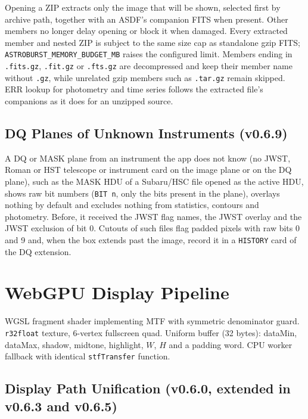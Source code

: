 \documentclass[11pt,a4paper]{article}
\newcommand{\code}[1]{\texttt{\small #1}}
\begin{document}
    Opening a ZIP extracts only the image that will be shown, selected first by archive path, together with an ASDF's companion FITS when present. Other members no longer delay opening or block it when damaged. Every extracted member and nested ZIP is subject to the same size cap as standalone gzip FITS; \code{ASTROBURST\_MEMORY\_BUDGET\_MB} raises the configured limit. Members ending in \code{.fits.gz}, \code{.fit.gz} or \code{.fts.gz} are decompressed and keep their member name without \code{.gz}, while unrelated gzip members such as \code{.tar.gz} remain skipped. ERR lookup for photometry and time series follows the extracted file's companions as it does for an unzipped source.

    \subsection{DQ Planes of Unknown Instruments (v0.6.9)}

    A DQ or MASK plane from an instrument the app does not know (no JWST, Roman or HST telescope or instrument card on the image plane or on the DQ plane), such as the MASK HDU of a Subaru/HSC file opened as the active HDU, shows raw bit numbers (\code{BIT n}, only the bits present in the plane), overlays nothing by default and excludes nothing from statistics, contours and photometry. Before, it received the JWST flag names, the JWST overlay and the JWST exclusion of bit 0. Cutouts of such files flag padded pixels with raw bits 0 and 9 and, when the box extends past the image, record it in a \code{HISTORY} card of the DQ extension.


    \section{WebGPU Display Pipeline}

    WGSL fragment shader implementing MTF with symmetric denominator guard. \code{r32float} texture, 6-vertex fullscreen quad. Uniform buffer (32 bytes): dataMin, dataMax, shadow, midtone, highlight, $W$, $H$ and a padding word. CPU worker fallback with identical \code{stfTransfer} function.

    \subsection{Display Path Unification (v0.6.0, extended in v0.6.3 and v0.6.5)}
\end{document}
